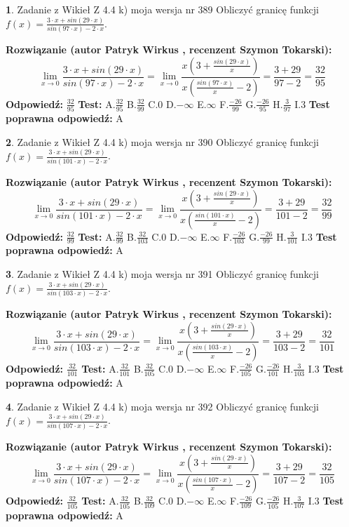 \documentclass[12pt, a4paper]{article}
\theoremstyle{definition} %
\newtheorem{zad}{}
\newcommand{\zadStart}[1]{\begin{zad}#1\newline}
\newcommand{\zadStop}{\end{zad}}
\newcommand{\rozwStart}[2]{\noindent \textbf{Rozwiązanie (autor #1 , recenzent #2): }\newline}
\newcommand{\rozwStop}{\newline}
\newcommand{\odpStart}{\noindent \textbf{Odpowiedź:}\newline}
\newcommand{\odpStop}{\newline}
\newcommand{\testStart}{\noindent \textbf{Test:}\newline}
\newcommand{\testStop}{\newline}
\newcommand{\kluczStart}{\noindent \textbf{Test poprawna odpowiedź:}\newline}
\newcommand{\kluczStop}{\newline}
\begin{document}
\zadStart{Zadanie z Wikieł Z 4.4 k) moja wersja nr 389}
Obliczyć granicę funkcji $f(x)=\frac{3\cdot x +sin(29\cdot x)}{sin(97\cdot x) -2\cdot x}$.
\zadStop
\rozwStart{Patryk Wirkus}{Szymon Tokarski}
$$\lim\limits_{x\to 0}\frac{3\cdot x +sin(29\cdot x)}{sin(97\cdot x) -2\cdot x}
=\lim\limits_{x\to 0}\frac{x(3+\frac{sin(29\cdot x)}{x})}{x(\frac{sin(97\cdot x)}{x}-2)}
=\frac{3+29}{97-2} = \frac{32}{95}$$
\rozwStop
\odpStart
$\frac{32}{95}$
\odpStop
\testStart
A.$\frac{32}{95}$
B.$\frac{32}{99}$
C.$0$
D.$-\infty$
E.$\infty$
F.$\frac{-26}{99}$
G.$\frac{-26}{95}$
H.$\frac{3}{97}$
I.$3$
\testStop
\kluczStart
A
\kluczStop



\zadStart{Zadanie z Wikieł Z 4.4 k) moja wersja nr 390}
Obliczyć granicę funkcji $f(x)=\frac{3\cdot x +sin(29\cdot x)}{sin(101\cdot x) -2\cdot x}$.
\zadStop
\rozwStart{Patryk Wirkus}{Szymon Tokarski}
$$\lim\limits_{x\to 0}\frac{3\cdot x +sin(29\cdot x)}{sin(101\cdot x) -2\cdot x}
=\lim\limits_{x\to 0}\frac{x(3+\frac{sin(29\cdot x)}{x})}{x(\frac{sin(101\cdot x)}{x}-2)}
=\frac{3+29}{101-2} = \frac{32}{99}$$
\rozwStop
\odpStart
$\frac{32}{99}$
\odpStop
\testStart
A.$\frac{32}{99}$
B.$\frac{32}{103}$
C.$0$
D.$-\infty$
E.$\infty$
F.$\frac{-26}{103}$
G.$\frac{-26}{99}$
H.$\frac{3}{101}$
I.$3$
\testStop
\kluczStart
A
\kluczStop



\zadStart{Zadanie z Wikieł Z 4.4 k) moja wersja nr 391}
Obliczyć granicę funkcji $f(x)=\frac{3\cdot x +sin(29\cdot x)}{sin(103\cdot x) -2\cdot x}$.
\zadStop
\rozwStart{Patryk Wirkus}{Szymon Tokarski}
$$\lim\limits_{x\to 0}\frac{3\cdot x +sin(29\cdot x)}{sin(103\cdot x) -2\cdot x}
=\lim\limits_{x\to 0}\frac{x(3+\frac{sin(29\cdot x)}{x})}{x(\frac{sin(103\cdot x)}{x}-2)}
=\frac{3+29}{103-2} = \frac{32}{101}$$
\rozwStop
\odpStart
$\frac{32}{101}$
\odpStop
\testStart
A.$\frac{32}{101}$
B.$\frac{32}{105}$
C.$0$
D.$-\infty$
E.$\infty$
F.$\frac{-26}{105}$
G.$\frac{-26}{101}$
H.$\frac{3}{103}$
I.$3$
\testStop
\kluczStart
A
\kluczStop



\zadStart{Zadanie z Wikieł Z 4.4 k) moja wersja nr 392}
Obliczyć granicę funkcji $f(x)=\frac{3\cdot x +sin(29\cdot x)}{sin(107\cdot x) -2\cdot x}$.
\zadStop
\rozwStart{Patryk Wirkus}{Szymon Tokarski}
$$\lim\limits_{x\to 0}\frac{3\cdot x +sin(29\cdot x)}{sin(107\cdot x) -2\cdot x}
=\lim\limits_{x\to 0}\frac{x(3+\frac{sin(29\cdot x)}{x})}{x(\frac{sin(107\cdot x)}{x}-2)}
=\frac{3+29}{107-2} = \frac{32}{105}$$
\rozwStop
\odpStart
$\frac{32}{105}$
\odpStop
\testStart
A.$\frac{32}{105}$
B.$\frac{32}{109}$
C.$0$
D.$-\infty$
E.$\infty$
F.$\frac{-26}{109}$
G.$\frac{-26}{105}$
H.$\frac{3}{107}$
I.$3$
\testStop
\kluczStart
A
\kluczStop
\end{document}
